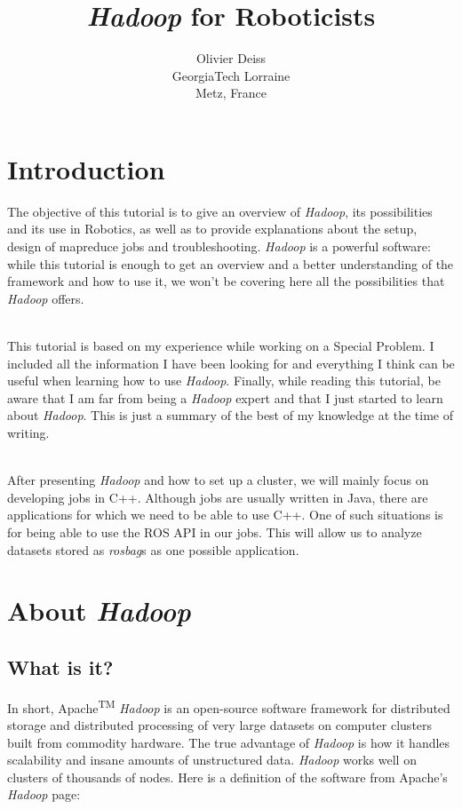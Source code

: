 \documentclass[a4paper, 12pt]{article}
\title{\textit{Hadoop} for Roboticists}
\author{Olivier Deiss\\GeorgiaTech Lorraine\\Metz, France}
\begin{document}
\begin{titlingpage}
\maketitle
\end{titlingpage}

\newpage
\tableofcontents
\newpage

\section{Introduction}

The objective of this tutorial is to give an overview of \textit{Hadoop}, its possibilities and its use in Robotics, as well as to provide explanations about the setup, design of mapreduce jobs and troubleshooting. \textit{Hadoop} is a powerful software: while this tutorial is enough to get an overview and a better understanding of the framework and how to use it, we won't be covering here all the possibilities that \textit{Hadoop} offers.

~\\
This tutorial is based on my experience while working on a Special Problem. I included all the information I have been looking for and everything I think can be useful when learning how to use \textit{Hadoop}. Finally, while reading this tutorial, be aware that I am far from being a \textit{Hadoop} expert and that I just started to learn about \textit{Hadoop}. This is just a summary of the best of my knowledge at the time of writing.

~\\
After presenting \textit{Hadoop} and how to set up a cluster, we will mainly focus on developing jobs in C++. Although jobs are usually written in Java, there are applications for which we need to be able to use C++. One of such situations is for being able to use the ROS API in our jobs. This will allow us to analyze datasets stored as \textit{rosbag}s as one possible application.

\section{About \textit{Hadoop}}

  \subsection{What is it?}

In short, Apache\textsuperscript{TM} \textit{Hadoop}\textsuperscript{\textregistered} is an open-source software framework for distributed storage and distributed processing of very large datasets on computer clusters built from commodity hardware. The true advantage of \textit{Hadoop} is how it handles scalability and insane amounts of unstructured data. \textit{Hadoop} works well on clusters of thousands of nodes. Here is a definition of the software from Apache's \textit{Hadoop} page:
\end{document}
